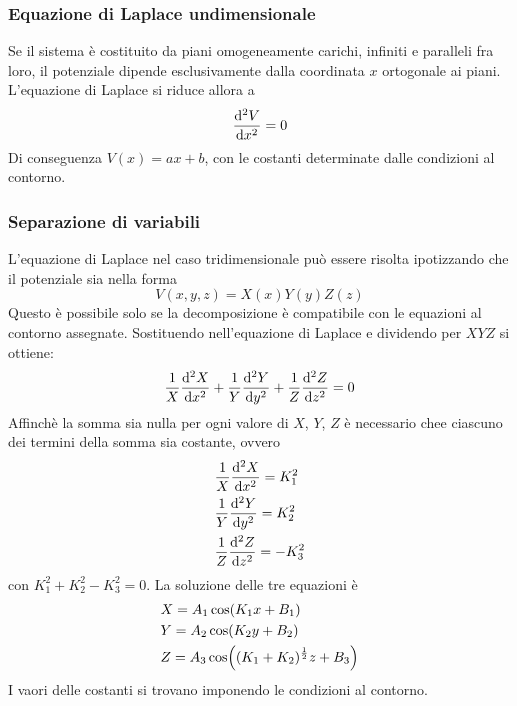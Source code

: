 \subsubsection{Equazione di Laplace undimensionale}
Se il sistema è costituito da piani omogeneamente carichi, infiniti e paralleli fra loro, il potenziale
dipende esclusivamente dalla coordinata $x$ ortogonale ai piani. L'equazione di Laplace si riduce allora a
\[
    \dv[2]{V}{x}=0
\]
Di conseguenza $V(x)=ax+b$, con le costanti determinate dalle condizioni al contorno.

\subsubsection{Separazione di variabili}
L'equazione di Laplace nel caso tridimensionale può essere risolta ipotizzando che il potenziale sia nella forma
\[
    V(x,y,z)=X(x)Y(y)Z(z)
\]
Questo è possibile solo se la decomposizione è compatibile con le equazioni al contorno assegnate.
Sostituendo nell'equazione di Laplace e dividendo per $XYZ$ si ottiene:
\[
    \frac{1}{X}\dv[2]{X}{x}+\frac{1}{Y}\dv[2]{Y}{y}+\frac{1}{Z}\dv[2]{Z}{z}=0
\]
Affinchè la somma sia nulla per ogni valore di $X$, $Y$, $Z$ è necessario chee ciascuno dei
termini della somma sia costante, ovvero
\[
    \begin{split}
        & \frac{1}{X}\dv[2]{X}{x} = K^2_1 \\
        & \frac{1}{Y}\dv[2]{Y}{y} = K^2_2 \\
        & \frac{1}{Z}\dv[2]{Z}{z} = -K^2_3
    \end{split}
\]
con $K^2_1+K^2_2-K^2_3=0$.
La soluzione delle tre equazioni è
\[
    \begin{split}
        & X =A_1\cos(K_1x+B_1) \\
        & Y =A_2\cos(K_2y+B_2) \\
        & Z =A_3\cos((K_1+K_2)^{\frac{1}{2}}z+B_3) \\
    \end{split}
\]
I vaori delle costanti si trovano imponendo le condizioni al contorno.
